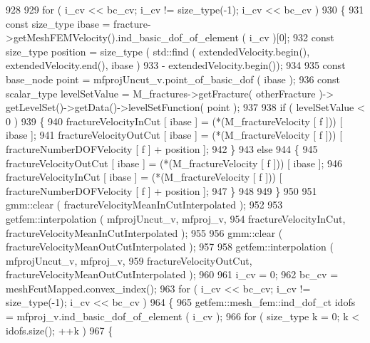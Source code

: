 \begin{DoxyCode}
928 
929                 \textcolor{keywordflow}{for} ( i\_cv << bc\_cv; i\_cv != size\_type(-1); i\_cv << bc\_cv )
930                 \{
931                     \textcolor{keyword}{const} size\_type ibase = fracture->getMeshFEMVelocity().ind\_basic\_dof\_of\_element ( i\_cv 
      )[0];
932                     \textcolor{keyword}{const} size\_type position = size\_type ( std::find ( extendedVelocity.begin(), 
      extendedVelocity.end(), ibase )
933                                                 - extendedVelocity.begin());
934 
935                     \textcolor{keyword}{const} base\_node point = mfprojUncut\_v.point\_of\_basic\_dof ( ibase );
936                     \textcolor{keyword}{const} scalar\_type levelSetValue = M\_fractures->getFracture( otherFracture )->
      getLevelSet()->getData()->levelSetFunction( point );
937 
938                     \textcolor{keywordflow}{if} ( levelSetValue < 0 )
939                     \{
940                         fractureVelocityInCut [ ibase ] = (*(M\_fractureVelocity [ f ])) [ ibase ];
941                         fractureVelocityOutCut [ ibase ] = (*(M\_fractureVelocity [ f ])) [ 
      fractureNumberDOFVelocity [ f ] + position ];
942                     \}
943                     \textcolor{keywordflow}{else}
944                     \{
945                         fractureVelocityOutCut [ ibase ] = (*(M\_fractureVelocity [ f ])) [ ibase ];
946                         fractureVelocityInCut [ ibase ] = (*(M\_fractureVelocity [ f ])) [ 
      fractureNumberDOFVelocity [ f ] + position ];
947                     \}
948 
949                 \}
950 
951                 gmm::clear ( fractureVelocityMeanInCutInterpolated );
952 
953                 getfem::interpolation ( mfprojUncut\_v, mfproj\_v,
954                                         fractureVelocityInCut, fractureVelocityMeanInCutInterpolated );
955 
956                 gmm::clear ( fractureVelocityMeanOutCutInterpolated );
957 
958                 getfem::interpolation ( mfprojUncut\_v, mfproj\_v,
959                                         fractureVelocityOutCut, fractureVelocityMeanOutCutInterpolated );
960 
961                 i\_cv = 0;
962                 bc\_cv = meshFcutMapped.convex\_index();
963                 \textcolor{keywordflow}{for} ( i\_cv << bc\_cv; i\_cv != size\_type(-1); i\_cv << bc\_cv )
964                 \{
965                     getfem::mesh\_fem::ind\_dof\_ct idofs = mfproj\_v.ind\_basic\_dof\_of\_element ( i\_cv );
966                     \textcolor{keywordflow}{for} ( size\_type k = 0; k < idofs.size(); ++k )
967                     \{

\end{DoxyCode}
